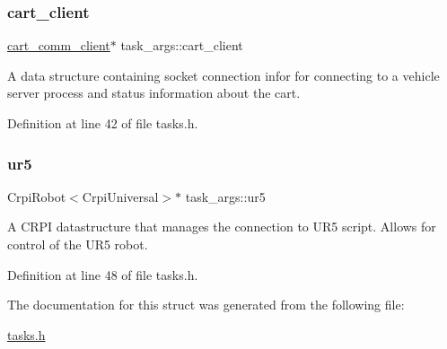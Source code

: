 \subsubsection{\texorpdfstring{cart\+\_\+client}{cart\_client}}
{\footnotesize\ttfamily \mbox{\hyperlink{classcart__comm__client}{cart\+\_\+comm\+\_\+client}}$\ast$ task\+\_\+args\+::cart\+\_\+client}

A data structure containing socket connection infor for connecting to a vehicle server process and status information about the cart. 

Definition at line 42 of file tasks.\+h.

\mbox{\label{structtask__args_a8097f89f57e14fb26dd96ccc8bb29fea}} 
\subsubsection{\texorpdfstring{ur5}{ur5}}
{\footnotesize\ttfamily Crpi\+Robot$<$Crpi\+Universal$>$$\ast$ task\+\_\+args\+::ur5}

A C\+R\+PI datastructure that manages the connection to U\+R5 script. Allows for control of the U\+R5 robot. 

Definition at line 48 of file tasks.\+h.



The documentation for this struct was generated from the following file\+:\begin{DoxyCompactItemize}
\item 
\mbox{\hyperlink{tasks_8h}{tasks.\+h}}\end{DoxyCompactItemize}
